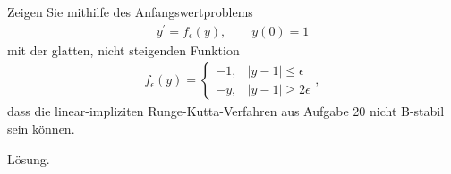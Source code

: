 \begin{exercise}
Zeigen Sie mithilfe des Anfangswertproblems
\begin{align*}
  y^{\prime} = f_{\epsilon}(y), \qquad y(0) = 1
\end{align*}
mit der glatten, nicht steigenden Funktion
\begin{align*}
  f_{\epsilon}(y) = \begin{cases}
    -1, & |y - 1| \leq \epsilon \\
    -y, & |y - 1| \geq 2\epsilon
  \end{cases},
\end{align*}
dass die linear-impliziten Runge-Kutta-Verfahren aus Aufgabe 20 nicht B-stabil sein können.
\end{exercise}
\begin{solution}
Lösung.
\end{solution}
